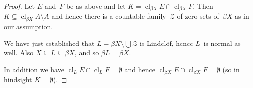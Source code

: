 \documentclass[10pt,a4paper]{amsart}
\newcommand\calZ{\mathcal{Z}}
\newcommand\clbeta[1][X]{\cl_{\beta #1}}
\newcommand\cl{\operatorname{cl}}
\begin{document}
\begin{proof}
\smallskip
Let $E$ and~$F$ be as above and let $K=\clbeta E\cap\clbeta F$.
Then $K\subseteq\clbeta A\setminus A$ and hence there is a
countable family~$\calZ$ of zero-sets of~$\beta X$ as in our assumption.

We have just established that $L=\beta X\setminus\bigcup\calZ$ 
is Lindel\"of, hence $L$~is normal as well.
Also $X\subseteq L\subseteq\beta X$, and so $\beta L=\beta X$.

In addition we have $\cl_LE\cap\cl_LF=\emptyset$ and hence 
$\clbeta E\cap\clbeta F=\emptyset$ (so in hindsight $K=\emptyset$).
\end{proof}
\end{document}
